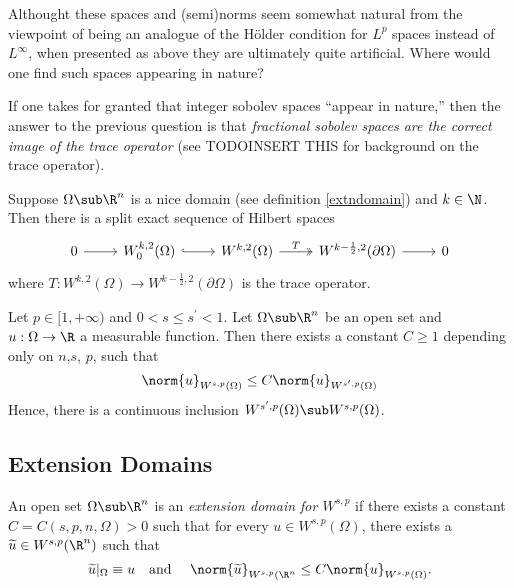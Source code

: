 \documentclass[../main.tex]{subfiles}
\begin{document}
Althought these spaces and (semi)norms seem somewhat natural from the viewpoint of being an analogue of the H\"{o}lder condition for $ L^{p} $ spaces instead of $ L^{\infty} $, when presented as above they are ultimately quite artificial. Where would one find such spaces appearing in nature?

If one takes for granted that integer sobolev spaces ``appear in nature,'' then the answer to the previous question is that \textit{fractional sobolev spaces are the correct image of the trace operator} (see TODOINSERT THIS for background on the trace operator).


\begin{proposition}
    Suppose $ \Omega\sub \R^{n} $ is a nice domain (see definition \ref{extndomain}) and $ k\in \N $. Then there is a split exact sequence of Hilbert spaces
\[\begin{tikzcd}
    0 & {W_0^{k,2}(\Omega)} & {W^{k,2}(\Omega)} & {W^{k-\frac{1}{2},2}(\partial\Omega)} & 0
	\arrow[from=1-1, to=1-2]
	\arrow[hook, from=1-2, to=1-3]
	\arrow["T", two heads, from=1-3, to=1-4]
	\arrow[from=1-4, to=1-5]
\end{tikzcd}\]
    where $ T: W^{k,2}(\Omega) \to W^{k-\frac{1}{2},2}(\partial\Omega)$ is the trace operator.
    
\end{proposition}

\begin{proposition}\label{fracisscale}
    Let $ p\in[1,+\infty) $ and $ 0 < s \leq s^{\prime} < 1 $. Let $ \Omega\sub \R^{n} $ be an open set and $ u:\Omega\to \R $ a measurable function. Then there exists a constant $ C \geq 1 $ depending only on $ n$,$s$, $p$, such that
    \[
        \norm{u}_{W^{s,p}(\Omega)} \leq C\norm{u}_{W^{s^{\prime},p}(\Omega)}
    \]
    Hence, there is a continuous inclusion $ W^{s^{\prime},p}(\Omega)\sub W^{s,p}(\Omega)$.
\end{proposition}


\subsection{Extension Domains}

\begin{definition}\label{extndomain}
    An open set $ \Omega\sub \R^{n} $ is an \textit{extension domain for $ W^{s,p} $} if  there exists a constant $ C = C(s,p,n,\Omega) > 0 $ such that for every $ u\in W^{s,p}(\Omega) $, there exists a $ \widetilde{u}\in W^{s,p}(\R^{n}) $ such that 
    \[
        \widetilde{u}\vert_{\Omega} \equiv u \quad\text{and }\quad \norm{\widetilde{u}}_{W^{s,p}(\R^{n}}\leq C \norm{u}_{W^{s,p}(\Omega)}.
    \]
\end{definition}
\end{document}
